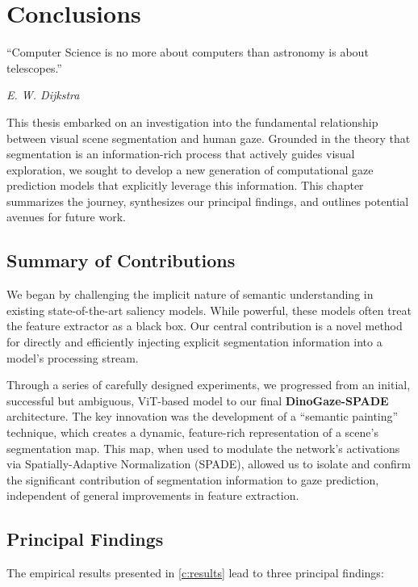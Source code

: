 \chapter{Conclusions}
\label{c:conc}

\epigraph{\enquote{Computer Science is no more about computers than astronomy is about telescopes.}}{\emph{E. W. Dijkstra}}

This thesis embarked on an investigation into the fundamental relationship between visual scene segmentation and human gaze. Grounded in the theory that segmentation is an information-rich process that actively guides visual exploration, we sought to develop a new generation of computational gaze prediction models that explicitly leverage this information. This chapter summarizes the journey, synthesizes our principal findings, and outlines potential avenues for future work.

\section{Summary of Contributions}

We began by challenging the implicit nature of semantic understanding in existing state-of-the-art saliency models. While powerful, these models often treat the feature extractor as a black box. Our central contribution is a novel method for directly and efficiently injecting explicit segmentation information into a model's processing stream.

Through a series of carefully designed experiments, we progressed from an initial, successful but ambiguous, ViT-based model to our final \textbf{DinoGaze-SPADE} architecture. The key innovation was the development of a \enquote{semantic painting} technique, which creates a dynamic, feature-rich representation of a scene's segmentation map. This map, when used to modulate the network's activations via Spatially-Adaptive Normalization (SPADE), allowed us to isolate and confirm the significant contribution of segmentation information to gaze prediction, independent of general improvements in feature extraction.

\section{Principal Findings}

The empirical results presented in \cref{c:results} lead to three principal findings:

